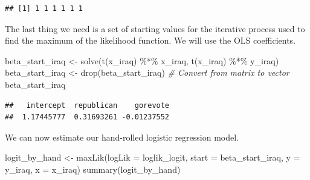\documentclass[
  12pt,
  oneside,openany]{book}
\newenvironment{Shaded}{\begin{snugshade}}{\end{snugshade}}
\newcommand{\AttributeTok}[1]{\textcolor[rgb]{0.77,0.63,0.00}{#1}}
\newcommand{\CommentTok}[1]{\textcolor[rgb]{0.56,0.35,0.01}{\textit{#1}}}
\newcommand{\DecValTok}[1]{\textcolor[rgb]{0.00,0.00,0.81}{#1}}
\newcommand{\FunctionTok}[1]{\textcolor[rgb]{0.00,0.00,0.00}{#1}}
\newcommand{\NormalTok}[1]{#1}
\newcommand{\OtherTok}[1]{\textcolor[rgb]{0.56,0.35,0.01}{#1}}
\newcommand{\SpecialCharTok}[1]{\textcolor[rgb]{0.00,0.00,0.00}{#1}}
\begin{document}
\begin{verbatim}
## [1] 1 1 1 1 1 1
\end{verbatim}

\begin{Shaded}
\end{Shaded}

The last thing we need is a set of starting values for the iterative process used to find the maximum of the likelihood function.
We will use the OLS coefficients.

\begin{Shaded}
\begin{Highlighting}[]
\NormalTok{beta\_start\_iraq }\OtherTok{\textless{}{-}} \FunctionTok{solve}\NormalTok{(}\FunctionTok{t}\NormalTok{(x\_iraq) }\SpecialCharTok{\%*\%}\NormalTok{ x\_iraq, }\FunctionTok{t}\NormalTok{(x\_iraq) }\SpecialCharTok{\%*\%}\NormalTok{ y\_iraq)}
\NormalTok{beta\_start\_iraq }\OtherTok{\textless{}{-}} \FunctionTok{drop}\NormalTok{(beta\_start\_iraq)  }\CommentTok{\# Convert from matrix to vector}
\NormalTok{beta\_start\_iraq}
\end{Highlighting}
\end{Shaded}

\begin{verbatim}
##   intercept  republican    gorevote 
##  1.17445777  0.31693261 -0.01237552
\end{verbatim}

We can now estimate our hand-rolled logistic regression model.

\begin{Shaded}
\begin{Highlighting}[]
\NormalTok{logit\_by\_hand }\OtherTok{\textless{}{-}} \FunctionTok{maxLik}\NormalTok{(}\AttributeTok{logLik =}\NormalTok{ loglik\_logit,}
                        \AttributeTok{start =}\NormalTok{ beta\_start\_iraq,}
                        \AttributeTok{y =}\NormalTok{ y\_iraq,}
                        \AttributeTok{x =}\NormalTok{ x\_iraq)}
\FunctionTok{summary}\NormalTok{(logit\_by\_hand)}
\end{Highlighting}
\end{Shaded}
\end{document}

